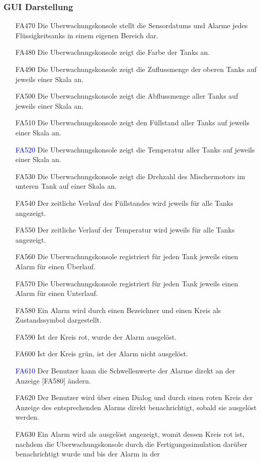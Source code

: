 \documentclass[parskip=full]{scrartcl}
\begin{document}
\subsubsection{GUI Darstellung}
\begin{enumerate}
  \item[FA470] Die \gls{Uberwachungskonsole} stellt die \glspl{Sensordatum} und Alarme jedes Flüssigkeitsanks in einem eigenen Bereich dar.
  \item[FA480] Die \gls{Uberwachungskonsole} zeigt die Farbe der Tanks an.
  \item[FA490] Die \gls{Uberwachungskonsole} zeigt die Zuflussmenge der oberen Tanks auf jeweils einer Skala an.
  \item[FA500] Die \gls{Uberwachungskonsole} zeigt die Abflussmenge aller Tanks auf jeweils einer Skala an.
  \item[FA510] Die \gls{Uberwachungskonsole} zeigt den Füllstand aller Tanks auf jeweils einer Skala an.
  \item[\textcolor{blue}{FA520}] Die \gls{Uberwachungskonsole} zeigt die Temperatur aller Tanks auf jeweils einer Skala an.
  \item[FA530] Die \gls{Uberwachungskonsole} zeigt die Drehzahl des Mischermotors im unteren Tank auf einer Skala an.
  \item[FA540] Der zeitliche Verlauf des Füllstandes wird jeweils für alle Tanks angezeigt.
  \item[FA550] Der zeitliche Verlauf der Temperatur wird jeweils für alle Tanks angezeigt.
  \item[FA560] Die \gls{Uberwachungskonsole} registriert für jeden Tank jeweils einen Alarm für einen Überlauf.
  \item[FA570] Die \gls{Uberwachungskonsole} registriert für jeden Tank jeweils einen Alarm für einen Unterlauf.
  \item[FA580] Ein Alarm wird durch einen Bezeichner und einen Kreis als Zustandssymbol dargestellt.
  \item[FA590] Ist der Kreis rot, wurde der Alarm ausgelöst.
  \item[FA600] Ist der Kreis grün, ist der Alarm nicht ausgelöst.
  \item[\textcolor{blue}{FA610}] Der Benutzer kann die Schwellenwerte der Alarme direkt an der Anzeige [FA580] ändern.
  \item[FA620] Der Benutzer wird über einen Dialog und durch einen roten Kreis der Anzeige des entsprechenden Alarms direkt benachrichtigt, sobald sie ausgelöst werden.
  \item[FA630] Ein Alarm wird als ausgelöst angezeigt, womit dessen Kreis rot ist, nachdem die \gls{Uberwachungskonsole} durch die \gls{Fertigungssimulation} darüber benachrichtigt wurde und bis der Alarm in der

\end{enumerate}
\end{document}
